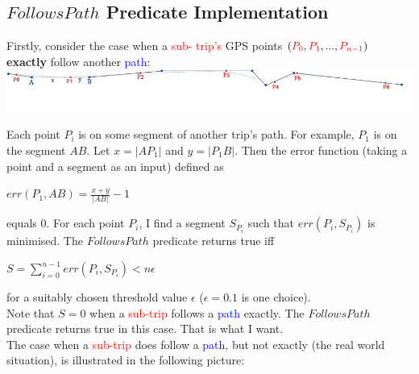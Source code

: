 \documentclass[12pt,a4paper,oneside,openright]{report}
\begin{document}
\subsection{$FollowsPath$ Predicate Implementation}

Firstly, consider the case when a \textcolor{red}{sub- trip's} GPS points
$(\textcolor{red}{P_0}, \textcolor{red}{P_1}, ..., \textcolor{red}{P_{n-1}})$
\textbf{exactly} follow another \textcolor{blue}{path}: \\

\includegraphics[width=\textwidth]{figs/follows_exactly.jpg}

Each point $P_i$ is on some segment of another trip's path.
For example, $P_1$ is on the segment $AB$.
Let $x = |AP_1|$ and $y = |P_1B|$. Then the
error function (taking a point and a segment as an input) defined as \\

\begin{centering}
$err(P_1, AB) = \frac{x + y}{|AB|} - 1$ \\
\end{centering}

\:
\:
\:

equals $0$. For each point $P_i$, I find a segment $S_{P_i}$ such that
$err(P_i, S_{P_i})$ is minimised. The $FollowsPath$ predicate returns true
iff

\begin{centering}
    $S = \sum_{i=0}^{n-1} err(P_i, S_{P_i}) < n\epsilon$ \\
\end{centering}

\:
\:
\:

for a suitably chosen threshold value $\epsilon$ ($\epsilon = 0.1$ is one choice). \\

Note that $S = 0$ when a \textcolor{red}{sub-trip} follows a
\textcolor{blue}{path} exactly. The $FollowsPath$
predicate returns true in this case. That is what I want. \\

The case when a \textcolor{red}{sub-trip} does follow a
\textcolor{blue}{path}, but not exactly (the real world situation), 
is illustrated in the following picture: \\
\end{document}
